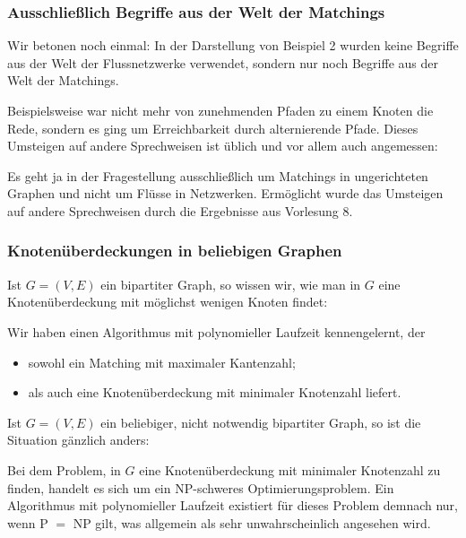 \documentclass[smaller]{beamer}
\begin{document}
\begin{frame}
\frametitle{Ausschließlich Begriffe aus der Welt der Matchings}
Wir betonen noch einmal: In der Darstellung von Beispiel 2 wurden keine Begriffe aus der \alert{{\glqq}Welt der Flussnetzwerke{\grqq}} verwendet, sondern nur noch Begriffe aus der \alert{{\glqq}Welt der Matchings{\grqq}}. \\ \vspace*{0.2cm}

Beispielsweise war nicht mehr von zunehmenden Pfaden zu einem Knoten die Rede, sondern es ging um \alert{Erreichbarkeit durch alternierende Pfade}. Dieses Umsteigen auf andere Sprechweisen ist üblich und vor allem auch angemessen: \\ \vspace*{0.2cm}

Es geht ja in der Fragestellung ausschließlich um Matchings in ungerichteten Graphen und nicht um Flüsse in Netzwerken. Ermöglicht wurde das Umsteigen auf andere Sprechweisen durch die Ergebnisse aus Vorlesung 8.
\end{frame}

\begin{frame}
\frametitle{Knotenüberdeckungen in beliebigen Graphen}
Ist $G=(V,E)$ ein \alert{bipartiter} Graph, so wissen wir, wie man in $G$ eine Knotenüberdeckung mit möglichst wenigen Knoten findet: \\ \vspace*{0.2cm}

Wir haben einen Algorithmus mit polynomieller Laufzeit kennengelernt, der
\begin{itemize}
 \item sowohl ein \alert{Matching mit maximaler Kantenzahl};
 \item als auch eine \alert{Knotenüberdeckung mit minimaler Knotenzahl} liefert.
\end{itemize} \vspace*{0.2cm}

Ist $G=(V,E)$ ein \alert{beliebiger}, nicht notwendig bipartiter Graph, so ist die Situation gänzlich anders: \\ \vspace*{0.2cm}

Bei dem Problem, in $G$ eine Knotenüberdeckung mit minimaler Knotenzahl zu finden, handelt es sich um ein \alert{NP-schweres Optimierungsproblem}. Ein Algorithmus mit polynomieller Laufzeit existiert für dieses Problem demnach nur, wenn P $=$ NP gilt, was allgemein als sehr unwahrscheinlich angesehen wird.
\end{frame}
\end{document}
